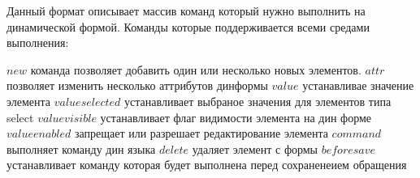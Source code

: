 \documentclass[../index.tex]{subfiles}
\begin{document}
Данный формат описывает массив команд который нужно выполнить на динамической формой.
Команды которые поддерживается всеми средами выполнения:

$new$ команда позволяет добавить один или несколько новых элементов.
$attr$ позволяет изменить несколько аттрибутов динформы
$value$ устанавливае значение элемента
$valueselected$ устанавливает выбраное значения для элементов типа select
$valuevisible$ устанавливает флаг видимости элемента на дин форме
$valueenabled$ запрещает или разрешает редактирование элемента
$command$ выполняет команду дин языка
$delete$ удаляет элемент с формы
$beforesave$ устанавливает команду которая будет выполнена перед сохраненеием обращения
\end{document}
